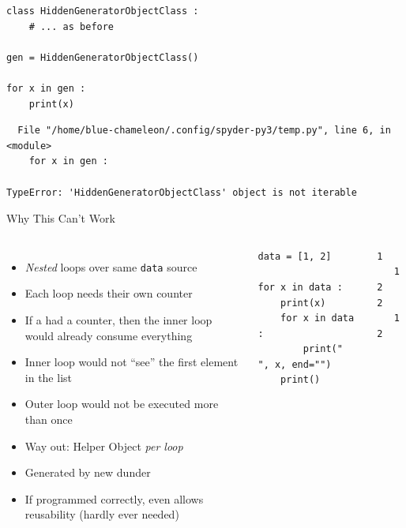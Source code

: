
\begin{frame}[fragile]
%
\begin{warnbox}[Example: Attempting to loop, leftupper=7mm]
\begin{verbatim}
class HiddenGeneratorObjectClass :
    # ... as before

gen = HiddenGeneratorObjectClass()

for x in gen :
    print(x)
\end{verbatim}
\end{warnbox}
%
\begin{cmdbox}
\begin{verbatim}
  File "/home/blue-chameleon/.config/spyder-py3/temp.py", line 6, in <module>
    for x in gen :

TypeError: 'HiddenGeneratorObjectClass' object is not iterable
\end{verbatim}
\end{cmdbox}
%
\end{frame}


\begin{frame}[fragile]{Why This Can't Work}
%
\begin{columns}[T]
\begin{itemize}
\item \emph{Nested} loops over same \texttt{data} source
\item Each loop needs their own counter
\item If a  had a counter, then the inner loop would already consume everything
\item Inner loop would not \enquote{see} the first element in the list
\item Outer loop would not be executed more than once
\item Way out: Helper Object \emph{per loop}
\item Generated by new dunder 
\item If programmed correctly, even allows reusability (hardly ever needed)
\end{itemize}
%
\begin{codebox}
\begin{verbatim}
data = [1, 2]

for x in data :
    print(x)
    for x in data :
        print("  ", x, end="")
    print()
\end{verbatim}
\end{codebox}
%
\begin{cmdbox}
\begin{verbatim}
1
   1   2
2
   1   2
\end{verbatim}
\end{cmdbox}
\end{columns}
%
\end{frame}

